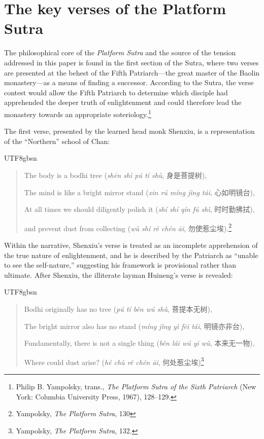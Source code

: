 \section{The key verses of the Platform Sutra}

The philosophical core of the \emph{Platform Sutra} and the source of
the tension addressed in this paper is found in the first section of the
Sutra, where two verses are presented at the behest of the Fifth
Patriarch---the great master of the Baolin monastery---as a means of
finding a successor. According to the Sutra, the verse contest would
allow the Fifth Patriarch to determine which disciple had apprehended
the deeper truth of enlightenment and could therefore lead the monastery
towards an appropriate soteriology.\footnote{Philip B. Yampolsky,
  trans., \emph{The Platform Sutra of the Sixth Patriarch} (New York:
  Columbia University Press, 1967), 128--129.}

The first verse, presented by the learned head monk Shenxiu, is a
representation of the ``Northern'' school of Chan:

\begin{CJK*}{UTF8}{gbsn}
\begin{quote}
The body is a bodhi tree (\emph{shēn shì pú tí shù}, 身是菩提树),

The mind is like a bright mirror stand (\emph{xīn rú míng jìng tái},
心如明镜台),

At all times we should diligently polish it (\emph{shí shí qín fú shì},
时时勤拂拭),

and prevent dust from collecting (\emph{wù shǐ rě chén āi},
勿使惹尘埃).\footnote{Yampolsky, \emph{The Platform Sutra}, 130}
\end{quote}
\end{CJK*}

\noindent Within the narrative, Shenxiu's verse is treated as an incomplete
apprehension of the true nature of enlightenment, and he is described by
the Patriarch as ``unable to see the self-nature,'' suggesting his
framework is provisional rather than ultimate. After Shenxiu, the
illiterate layman Huineng's verse is revealed:

\begin{CJK*}{UTF8}{gbsn}
\begin{quote}
Bodhi originally has no tree (\emph{pú tí běn wú shù}, 菩提本无树),

The bright mirror also has no stand (\emph{míng jìng yì fēi tái},
明镜亦非台),

Fundamentally, there is not a single thing (\emph{běn lái wú yī wù},
本来无一物),

Where could dust arise? (\emph{hé chù rě chén āi},
何处惹尘埃)\footnote{Yampolsky, \emph{The Platform Sutra}, 132.}
\end{quote}
\end{CJK*}

